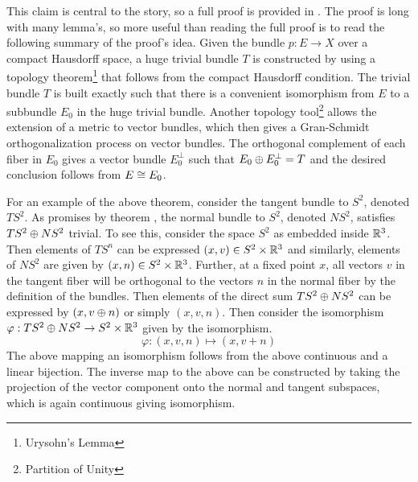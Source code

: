 \documentclass[../sean_thesis.tex]{subfiles}
\begin{document}
This claim is central to the story, so a full proof  is provided in . The proof is long with many lemma's, so more useful than reading the full proof is to read the following summary of the proof's idea. Given the bundle $p: E \to X$ over a compact Hausdorff space, a huge trivial bundle $T$ is constructed by using a topology theorem\footnote{Urysohn's Lemma} that follows from the compact Hausdorff condition. The trivial bundle $T$ is built exactly such that there is a convenient isomorphism from $E$ to a subbundle $E_0$ in the huge trivial bundle. Another topology tool\footnote{Partition of Unity} allows the  extension of a metric to vector bundles, which then gives a Gran-Schmidt orthogonalization process on vector bundles. The orthogonal complement of each fiber in $E_0$ gives a vector bundle $E_0^{\perp}$ such that $E_0 \oplus E_0^{\perp} = T$ and the desired conclusion follows from $E \cong E_0$.


\begin{example}
	For an example of the above theorem, consider the tangent bundle to $S^2$, denoted $TS^2$. As promises by theorem , the normal bundle to $S^2$, denoted $NS^2$, satisfies $TS^2 \oplus NS^2$ trivial. To see this, consider the space $S^2$ as embedded inside $\mathbb{R}^3$. Then elements of $TS^n$  can be expressed $(x,v) \in S^2 \times \mathbb{R}^3$ and similarly, elements of $NS^2$ are given by $(x,n) \in S^2 \times \mathbb{R}^3$. Further, at a fixed point $x$, all vectors $v$ in the tangent fiber will be orthogonal to the vectors $n$ in the normal fiber by the definition of the bundles. Then elements of the direct sum $TS^2 \oplus NS^2$ can be expressed by $(x, v \oplus n)$ or simply $(x,v,n)$. Then consider the isomorphism $\varphi: TS^2 \oplus NS^2 \to S^2 \times \mathbb{R}^3$ given by the isomorphism.
	\begin{equation*}
		\varphi: (x, v, n) \mapsto (x, v+n)
	\end{equation*}
The above mapping an isomorphism follows from the above continuous and a linear bijection. The inverse map to the above can be constructed by taking the projection of the vector component onto the normal and tangent subspaces, which is again continuous giving isomorphism.	
\end{example}



\end{document}
